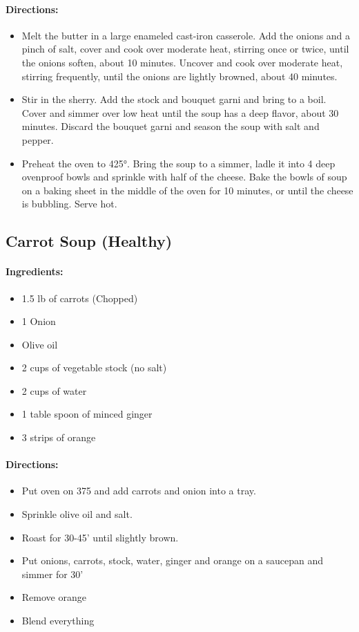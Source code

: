 \documentclass{article}
\begin{document}
\paragraph{Directions:}
\begin{itemize}
	\item Melt the butter in a large enameled cast-iron casserole. Add the onions and a pinch of salt, cover and cook over moderate heat, stirring once or twice, until the onions soften, about 10 minutes. Uncover and cook over moderate heat, stirring frequently, until the onions are lightly browned, about 40 minutes.
	\item Stir in the sherry. Add the stock and bouquet garni and bring to a boil. Cover and simmer over low heat until the soup has a deep flavor, about 30 minutes. Discard the bouquet garni and season the soup with salt and pepper.
	\item Preheat the oven to 425°. Bring the soup to a simmer, ladle it into 4 deep ovenproof bowls and sprinkle with half of the cheese. Bake the bowls of soup on a baking sheet in the middle of the oven for 10 minutes, or until the cheese is bubbling. Serve hot.
\end{itemize}

\subsection{Carrot Soup (Healthy)}

\paragraph{Ingredients:}
\begin{itemize}
	\item 1.5 lb of carrots (Chopped)
	\item 1 Onion
	\item Olive oil
	\item 2 cups of vegetable stock (no salt)
	\item 2 cups of water
	\item 1 table spoon of minced ginger
	\item 3 strips of orange
\end{itemize}

\paragraph{Directions:}
\begin{itemize}
	\item Put oven on 375 and add carrots and onion into a tray.
	\item Sprinkle olive oil and salt.
	\item Roast for 30-45' until slightly brown.
	\item Put onions, carrots, stock, water, ginger and orange on a saucepan and simmer for 30'
	\item Remove orange
	\item Blend everything
\end{itemize}
\end{document}
